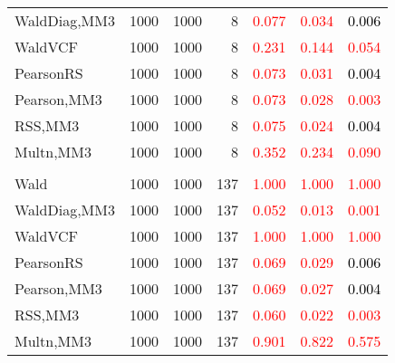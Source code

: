 \documentclass[
]{article}
\begin{document}
\begin{table}[H]
{\begin{tabular}[t]{lrrrrrr}
\hspace{1em}WaldDiag,MM3 & 1000 & 1000 & 8 & \textcolor{red}{0.077} & \textcolor{red}{0.034} & \textcolor{black}{0.006}\\
\hspace{1em}WaldVCF & 1000 & 1000 & 8 & \textcolor{red}{0.231} & \textcolor{red}{0.144} & \textcolor{red}{0.054}\\
\hspace{1em}PearsonRS & 1000 & 1000 & 8 & \textcolor{red}{0.073} & \textcolor{red}{0.031} & \textcolor{black}{0.004}\\
\hspace{1em}Pearson,MM3 & 1000 & 1000 & 8 & \textcolor{red}{0.073} & \textcolor{red}{0.028} & \textcolor{red}{0.003}\\
\hspace{1em}RSS,MM3 & 1000 & 1000 & 8 & \textcolor{red}{0.075} & \textcolor{red}{0.024} & \textcolor{black}{0.004}\\
\hspace{1em}Multn,MM3 & 1000 & 1000 & 8 & \textcolor{red}{0.352} & \textcolor{red}{0.234} & \textcolor{red}{0.090}\\
\addlinespace[0.3em]
\multicolumn{7}{l}{\textbf{1F 15V}}\\
\hspace{1em}Wald & 1000 & 1000 & 137 & \textcolor{red}{1.000} & \textcolor{red}{1.000} & \textcolor{red}{1.000}\\
\hspace{1em}WaldDiag,MM3 & 1000 & 1000 & 137 & \textcolor{red}{0.052} & \textcolor{red}{0.013} & \textcolor{red}{0.001}\\
\hspace{1em}WaldVCF & 1000 & 1000 & 137 & \textcolor{red}{1.000} & \textcolor{red}{1.000} & \textcolor{red}{1.000}\\
\hspace{1em}PearsonRS & 1000 & 1000 & 137 & \textcolor{red}{0.069} & \textcolor{red}{0.029} & \textcolor{black}{0.006}\\
\hspace{1em}Pearson,MM3 & 1000 & 1000 & 137 & \textcolor{red}{0.069} & \textcolor{red}{0.027} & \textcolor{black}{0.004}\\
\hspace{1em}RSS,MM3 & 1000 & 1000 & 137 & \textcolor{red}{0.060} & \textcolor{red}{0.022} & \textcolor{red}{0.003}\\
\hspace{1em}Multn,MM3 & 1000 & 1000 & 137 & \textcolor{red}{0.901} & \textcolor{red}{0.822} & \textcolor{red}{0.575}\\

\end{tabular}}
\end{table}
\end{document}
